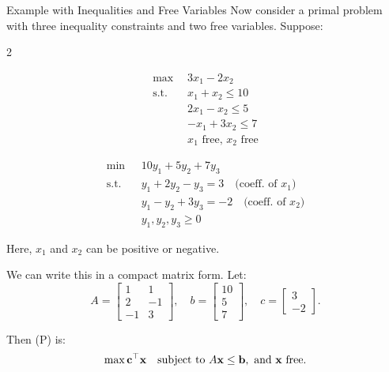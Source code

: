 \begin{example}{Example with Inequalities and Free Variables}{}
Now consider a primal problem with three inequality constraints and two free variables. Suppose:

\begin{multicols}{2}
\begin{tcolorbox}[title=Primal (P), colback=blue!5, colframe=blue!60!black, sharp corners=south]
\[
\begin{aligned}
\max\ & 3x_1 - 2x_2 \\
\text{s.t.} \quad 
& x_1 + x_2 \leq 10 \\
& 2x_1 - x_2 \leq 5 \\
& -x_1 + 3x_2 \leq 7 \\
& x_1 \text{ free, } x_2 \text{ free}
\end{aligned}
\]
\end{tcolorbox}

\columnbreak

\begin{tcolorbox}[title=Dual (D), colback=green!5, colframe=green!60!black, sharp corners=south]
\[
\begin{aligned}
\min\ & 10y_1 + 5y_2 + 7y_3 \\
\text{s.t.} \quad 
& y_1 + 2y_2 - y_3 = 3 \quad \text{(coeff. of } x_1) \\
& y_1 - y_2 + 3y_3 = -2 \quad \text{(coeff. of } x_2) \\
& y_1, y_2, y_3 \geq 0
\end{aligned}
\]
\end{tcolorbox}
\end{multicols}

Here, $x_1$ and $x_2$ can be positive or negative. 

We can write this in a compact matrix form. Let:
\[
A = \begin{bmatrix}
1 & 1 \\
2 & -1 \\
-1 & 3 
\end{bmatrix}, \quad b = \begin{bmatrix}
10 \\ 5 \\ 7
\end{bmatrix}, \quad c = \begin{bmatrix}
3 \\ -2
\end{bmatrix}.
\]

Then (P) is:
\[
\max \mathbf{c}^\top \mathbf{x} \quad \text{subject to } A \mathbf{x} \leq \mathbf{b}, \text{ and } \mathbf{x} \text{ free}.
\]


\end{example}
